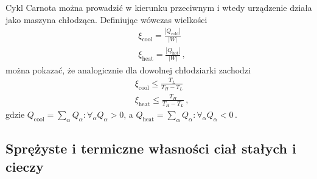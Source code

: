 \documentclass[../main.tex]{subfiles}
\begin{document}
Cykl Carnota można prowadzić w kierunku przeciwnym i wtedy urządzenie działa jako maszyna chłodząca.
Definiując wówczas wielkości
\begin{equation*}
\begin{split}
    &\xi_\text{cool}=\frac{|Q_\text{cold}|}{|W|}\\
    &\xi_\text{heat}=\frac{|Q_\text{hot}|}{|W|}\,,
\end{split}
\end{equation*}
można pokazać, że analogicznie dla dowolnej chłodziarki zachodzi
\begin{equation*}
    \begin{split}
        &\xi_\text{cool}\leq \frac{T_L}{T_H-T_L}\\
        &\xi_\text{heat}\leq\frac{T_H}{T_H-T_L}\,,
    \end{split}
\end{equation*}
gdzie \(Q_\text{cool}=\sum_\alpha Q_\alpha : \forall_\alpha Q_\alpha >0\), a
\(Q_\text{heat}=\sum_\alpha Q_\alpha : \forall_\alpha Q_\alpha <0\)\,.

\subsection{Sprężyste i termiczne własności ciał stałych i cieczy}
\end{document}

